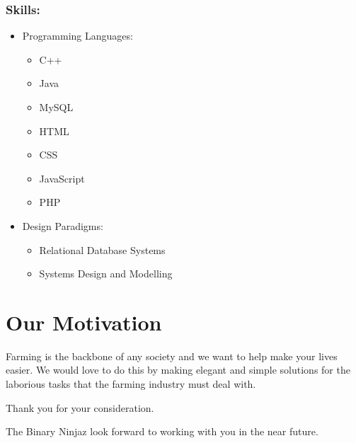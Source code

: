 \documentclass[12pt]{article}
\begin{document}
	\subsubsection{Skills:}
	\begin{itemize}
	\item Programming Languages:
	\begin{itemize}
	\item C++
	\item Java
	\item MySQL
	\item HTML
	\item CSS
	\item JavaScript
	\item PHP
	\end{itemize}
	\item Design Paradigms:
	\begin{itemize}
	\item Relational Database Systems
	\item Systems Design and Modelling
	\end{itemize}
	\end{itemize}
	
	\section{Our Motivation}
	Farming is the backbone of any society and we want to help make your lives easier. We would love to do this by making elegant and simple solutions for the laborious tasks that the farming industry must deal with.
	
	\newpage
	
	\begin{center}
	{\Huge Thank you for your consideration.}
	\end{center}
	\begin{center}
	{\Large The Binary Ninjaz look forward to working with you in the near future.}
	\end{center}
	
\end{document}

